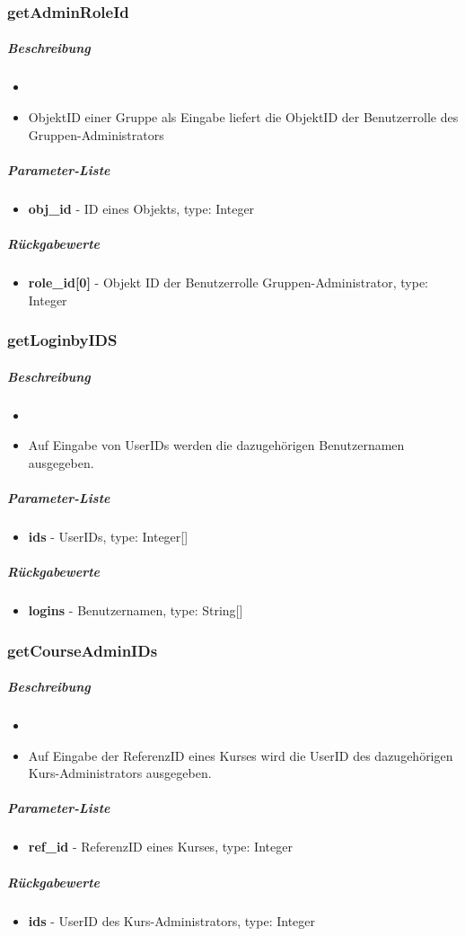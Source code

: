 \subsubsection*{getAdminRoleId}\label{getAdminRoleIdGDGUI}
\subparagraph{Beschreibung}
\begin{itemize}
	\item[]  \noindent{} 
	\item[] ObjektID einer Gruppe als Eingabe liefert die ObjektID der Benutzerrolle des Gruppen-Administrators
\end{itemize}
\subparagraph{Parameter-Liste}
\begin{itemize}
	\item[] \textbf{obj\_id} - ID eines Objekts, type: Integer
\end{itemize}
\subparagraph{Rückgabewerte}
\begin{itemize}
	\item[] \textbf{role\_id[0]} - Objekt ID der Benutzerrolle Gruppen-Administrator, type: Integer
\end{itemize}

\subsubsection*{getLoginbyIDS}\label{getLoginbyIDSGDGUI}
\subparagraph{Beschreibung}
\begin{itemize}
	\item[]  \noindent{} 
	\item[] Auf Eingabe von UserIDs werden die dazugehörigen Benutzernamen ausgegeben.
\end{itemize}
\subparagraph{Parameter-Liste}
\begin{itemize}
	\item[] \textbf{ids} - UserIDs, type: Integer[]
\end{itemize}
\subparagraph{Rückgabewerte}
\begin{itemize}
	\item[] \textbf{logins} - Benutzernamen, type: String[]
\end{itemize}

\subsubsection*{getCourseAdminIDs}\label{getCourseAdminIDsGDGUI}
\subparagraph{Beschreibung}
\begin{itemize}
	\item[]  \noindent{} 
	\item[] Auf Eingabe der ReferenzID eines Kurses wird die UserID des dazugehörigen Kurs-Administrators ausgegeben.
\end{itemize}
\subparagraph{Parameter-Liste}
\begin{itemize}
	\item[] \textbf{ref\_id} - ReferenzID eines Kurses, type: Integer
\end{itemize}
\subparagraph{Rückgabewerte}
\begin{itemize}
	\item[] \textbf{ids} - UserID des Kurs-Administrators, type: Integer
\end{itemize}

